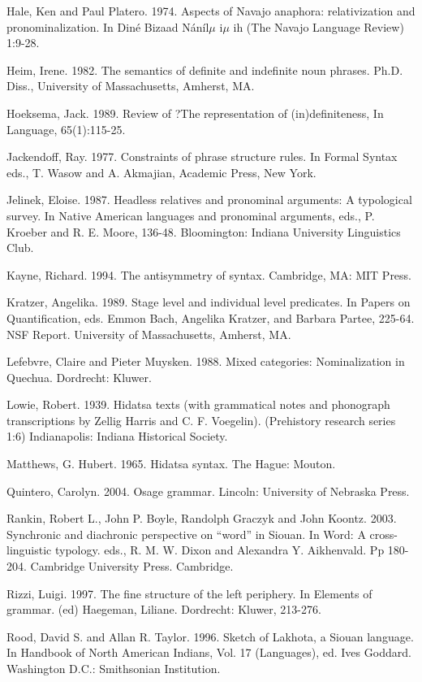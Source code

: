 \documentclass[output=paper]{LSP/langsci}
\begin{document}
\begin{reflist}
Hale, Ken and Paul Platero. 1974. Aspects of Navajo anaphora: relativization and pronominalization.  In Din\'e Bizaad N\'an\'il$\mu$ i$\mu$ ih (The Navajo Language Review) 1:9-28.

Heim, Irene. 1982. The semantics of definite and indefinite noun phrases. Ph.D. Diss., University of Massachusetts, Amherst, MA.

Hoeksema, Jack. 1989. Review of ?The representation of (in)definiteness, In Language, 65(1):115-25.

Jackendoff, Ray. 1977. Constraints of phrase structure rules. In Formal Syntax  eds., T. Wasow and A. Akmajian, Academic Press, New York.

Jelinek, Eloise. 1987. Headless relatives and pronominal arguments: A typological survey. In Native American languages and pronominal arguments, eds., P. Kroeber and R. E. Moore, 136-48. Bloomington: Indiana University Linguistics Club.

Kayne, Richard. 1994. The antisymmetry of syntax. Cambridge, MA: MIT Press. 

Kratzer, Angelika. 1989. Stage level and individual level predicates.  In Papers on Quantification, eds. Emmon Bach, Angelika Kratzer, and Barbara Partee, 225-64. NSF Report. University of Massachusetts, Amherst, MA.

Lefebvre, Claire and Pieter Muysken. 1988. Mixed categories: Nominalization in Quechua. Dordrecht: Kluwer.

Lowie, Robert. 1939. Hidatsa texts (with grammatical notes and phonograph transcriptions by Zellig Harris and C. F. Voegelin). (Prehistory research series 1:6) Indianapolis: Indiana Historical Society.

Matthews, G. Hubert. 1965. Hidatsa syntax. The Hague: Mouton.

Quintero, Carolyn. 2004. Osage grammar. Lincoln: University of Nebraska Press.

Rankin, Robert L., John P. Boyle, Randolph Graczyk and John Koontz. 2003. Synchronic and diachronic perspective on ``word'' in Siouan. In Word: A cross-linguistic typology. eds., R. M. W. Dixon and Alexandra Y. Aikhenvald. Pp 180-204. Cambridge University Press. Cambridge.

Rizzi, Luigi. 1997. The fine structure of the left periphery. In Elements of grammar. (ed) Haegeman, Liliane. Dordrecht: Kluwer, 213-276.

Rood, David S. and Allan R. Taylor. 1996.  Sketch of Lakhota, a Siouan language. In Handbook of North American Indians, Vol. 17 (Languages), ed. Ives Goddard. Washington D.C.: Smithsonian Institution.


\end{reflist}
\end{document}
